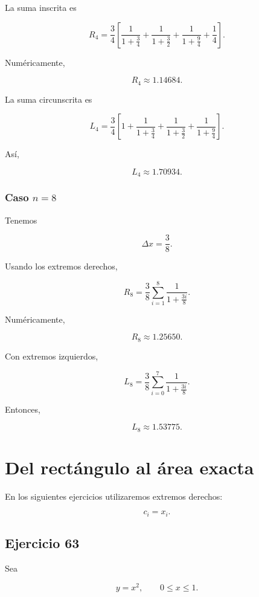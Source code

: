 \documentclass[12pt]{article}
\begin{document}
La suma inscrita es

\[
R_4
=
\frac34
\left[
\frac{1}{1+\frac34}
+
\frac{1}{1+\frac32}
+
\frac{1}{1+\frac94}
+
\frac14
\right].
\]

Numéricamente,

\[
\boxed{
R_4\approx1.14684
}.
\]

La suma circunscrita es

\[
L_4
=
\frac34
\left[
1
+
\frac{1}{1+\frac34}
+
\frac{1}{1+\frac32}
+
\frac{1}{1+\frac94}
\right].
\]

Así,

\[
\boxed{
L_4\approx1.70934
}.
\]

\subsubsection*{Caso \(n=8\)}

Tenemos

\[
\Delta x
=
\frac38.
\]

Usando los extremos derechos,

\[
R_8
=
\frac38
\sum_{i=1}^{8}
\frac{1}{1+\frac{3i}{8}}.
\]

Numéricamente,

\[
\boxed{
R_8\approx1.25650
}.
\]

Con extremos izquierdos,

\[
L_8
=
\frac38
\sum_{i=0}^{7}
\frac{1}{1+\frac{3i}{8}}.
\]

Entonces,

\[
\boxed{
L_8\approx1.53775
}.
\]

\section*{Del rectángulo al área exacta}

En los siguientes ejercicios utilizaremos extremos derechos:

\[
c_i=x_i.
\]

\subsection*{Ejercicio 63}

Sea

\[
y=x^2,
\qquad
0\leq x\leq1.
\]
\end{document}
